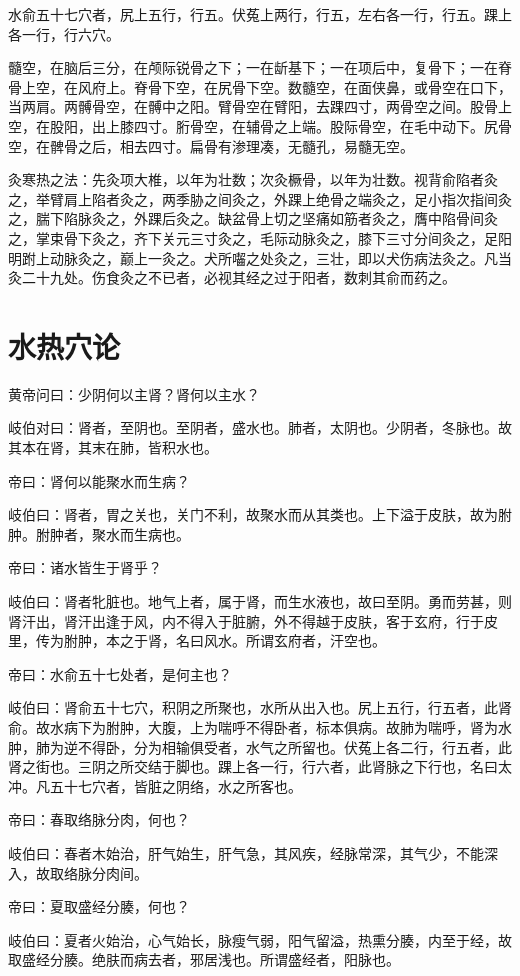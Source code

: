 \documentclass{article}%
\begin{document}
水俞五十七穴者，尻上五行，行五。伏菟上两行，行五，左右各一行，行五。踝上各一行，行六穴。

髓空，在脑后三分，在颅际锐骨之下；一在龂基下；一在项后中，复骨下；一在脊骨上空，在风府上。脊骨下空，在尻骨下空。数髓空，在面侠鼻，或骨空在口下，当两肩。两髆骨空，在髆中之阳。臂骨空在臂阳，去踝四寸，两骨空之间。股骨上空，在股阳，出上膝四寸。胻骨空，在辅骨之上端。股际骨空，在毛中动下。尻骨空，在髀骨之后，相去四寸。扁骨有渗理凑，无髓孔，易髓无空。

灸寒热之法：先灸项大椎，以年为壮数；次灸橛骨，以年为壮数。视背俞陷者灸之，举臂肩上陷者灸之，两季胁之间灸之，外踝上绝骨之端灸之，足小指次指间灸之，腨下陷脉灸之，外踝后灸之。缺盆骨上切之坚痛如筋者灸之，膺中陷骨间灸之，掌束骨下灸之，齐下关元三寸灸之，毛际动脉灸之，膝下三寸分间灸之，足阳明跗上动脉灸之，巅上一灸之。犬所囓之处灸之，三壮，即以犬伤病法灸之。凡当灸二十九处。伤食灸之不已者，必视其经之过于阳者，数刺其俞而药之。
\section{水热穴论}
黄帝问曰：少阴何以主肾？肾何以主水？

岐伯对曰：肾者，至阴也。至阴者，盛水也。肺者，太阴也。少阴者，冬脉也。故其本在肾，其末在肺，皆积水也。

帝曰：肾何以能聚水而生病？

岐伯曰：肾者，胃之关也，关门不利，故聚水而从其类也。上下溢于皮肤，故为胕肿。胕肿者，聚水而生病也。

帝曰：诸水皆生于肾乎？

岐伯曰：肾者牝脏也。地气上者，属于肾，而生水液也，故曰至阴。勇而劳甚，则肾汗出，肾汗出逢于风，内不得入于脏腑，外不得越于皮肤，客于玄府，行于皮里，传为胕肿，本之于肾，名曰风水。所谓玄府者，汗空也。

帝曰：水俞五十七处者，是何主也？

岐伯曰：肾俞五十七穴，积阴之所聚也，水所从出入也。尻上五行，行五者，此肾俞。故水病下为胕肿，大腹，上为喘呼不得卧者，标本俱病。故肺为喘呼，肾为水肿，肺为逆不得卧，分为相输俱受者，水气之所留也。伏菟上各二行，行五者，此肾之街也。三阴之所交结于脚也。踝上各一行，行六者，此肾脉之下行也，名曰太冲。凡五十七穴者，皆脏之阴络，水之所客也。

帝曰：春取络脉分肉，何也？

岐伯曰：春者木始治，肝气始生，肝气急，其风疾，经脉常深，其气少，不能深入，故取络脉分肉间。

帝曰：夏取盛经分腠，何也？

岐伯曰：夏者火始治，心气始长，脉瘦气弱，阳气留溢，热熏分腠，内至于经，故取盛经分腠。绝肤而病去者，邪居浅也。所谓盛经者，阳脉也。
\end{document}
